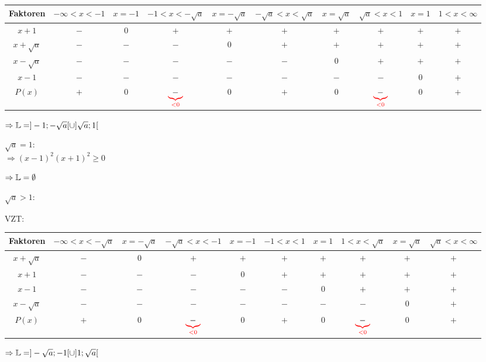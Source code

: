 \begin{enumerate}[A)]
\begin{enumerate}[1.]
		\hspace{-75pt}
		\begin{tabular}{c|c|c|c|c|c|c|c|c|c}
			Faktoren & \parbox{38pt}{$-\infty<x<-1$} & $x=-1$ & \parbox{38pt}{$-1<x<-\sqrt{a}$} & $x=-\sqrt{a}$ & \parbox{38pt}{$-\sqrt{a}<x<\sqrt{a}$} & $x=\sqrt{a}$ & \parbox{38pt}{$\sqrt{a}<x<1$} & $x=1$ & \parbox{38pt}{$1<x<\infty$}\\
			\hline
			$x + 1$ & $-$ & $0$ & $+$ & $+$ & $+$ & $+$ & $+$ & $+$ & $+$ \\
			$x + \sqrt{a}$ & $-$ & $-$ & $-$ & $0$ & $+$ & $+$ & $+$ & $+$ & $+$ \\
			$x - \sqrt{a}$ & $-$ & $-$ & $-$ & $-$ & $-$ & $0$ & $+$ & $+$ & $+$ \\
			$x - 1$ & $-$ & $-$ & $-$ & $-$ & $-$ & $-$ & $-$ & $0$ & $+$ \\
			\hline
			$P(x)$ & $+$ & $0$ & $\textcolor{red}{\underbrace{\textcolor{black}{-}}_{<0}}$ & $0$ & $+$ & $0$ & $\textcolor{red}{\underbrace{\textcolor{black}{-}}_{<0}}$ & $0$ & $+$ \\
		\end{tabular}
		
		$\Rightarrow \mathbb{L}=]-1;-\sqrt{a}[ \cup ]\sqrt{a};1[$
		
		\ul{$\sqrt{a}=1$}:\\
		$\Rightarrow (x-1)^2(x+1)^2\ge0$
		
		$\Rightarrow \mathbb{L}=\emptyset$
		
		\ul{$\sqrt{a}>1$}:
		
		VZT:
		
		\hspace{-75pt}
		\begin{tabular}{c|c|c|c|c|c|c|c|c|c}
			Faktoren & \parbox{38pt}{$-\infty<x<-\sqrt{a}$} & $x=-\sqrt{a}$ & \parbox{38pt}{$-\sqrt{a}<x<-1$} & $x=-1$ & \parbox{38pt}{$-1<x<1$} & $x=1$ & \parbox{38pt}{$1<x<\sqrt{a}$} & $x=\sqrt{a}$ & \parbox{38pt}{$\sqrt{a}<x<\infty$}\\
			\hline
			$x + \sqrt{a}$ & $-$ & $0$ & $+$ & $+$ & $+$ & $+$ & $+$ & $+$ & $+$ \\
			$x + 1$ & $-$ & $-$ & $-$ & $0$ & $+$ & $+$ & $+$ & $+$ & $+$ \\
			$x - 1$ & $-$ & $-$ & $-$ & $-$ & $-$ & $0$ & $+$ & $+$ & $+$ \\
			$x - \sqrt{a}$ & $-$ & $-$ & $-$ & $-$ & $-$ & $-$ & $-$ & $0$ & $+$ \\
			\hline
			$P(x)$ & $+$ & $0$ & $\textcolor{red}{\underbrace{\textcolor{black}{-}}_{<0}}$ & $0$ & $+$ & $0$ & $\textcolor{red}{\underbrace{\textcolor{black}{-}}_{<0}}$ & $0$ & $+$ \\
		\end{tabular}
		
		$\Rightarrow \mathbb{L}=]-\sqrt{a};-1[ \cup ]1;\sqrt{a}[$
		
	\end{enumerate}
\end{enumerate}

